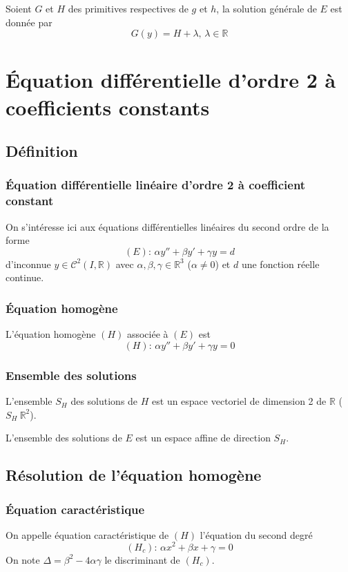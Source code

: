\documentclass[a4paper,10pt]{book} %
\newcommand{\R}{\mathbb{R}}
\begin{document}
Soient $G$ et $H$ des primitives respectives de $g$ et $h$,
la solution générale de $E$ est donnée par $$G(y)=H+\lambda\text{, }\lambda\in \R$$

\newpage

\section{Équation différentielle d'ordre 2 à coefficients constants}
\subsection{Définition}
\subsubsection{Équation différentielle linéaire d'ordre 2 à coefficient constant}
On s’intéresse ici aux équations différentielles linéaires du second ordre de la forme $$(E)\text{: } \alpha y''+\beta y'+\gamma y=d$$
d'inconnue $y\in \mathcal{C}^2(I,\R)$ avec $\alpha,\beta,\gamma\in \R^3$ ($\alpha\neq 0$) et $d$ une fonction réelle continue.

\subsubsection{Équation homogène}
L'équation homogène $(H)$ associée à $(E)$ est $$(H)\text{: } \alpha y''+\beta y'+\gamma y=0$$

\subsubsection{Ensemble des solutions}
L'ensemble $S_H$ des solutions de $H$ est un espace vectoriel de dimension 2 de $\R$ ($S_H~\R^2$).

L'ensemble des solutions de $E$ est un espace affine de direction $S_H$.

\subsection{Résolution de l'équation homogène}
\subsubsection{Équation caractéristique}
On appelle équation caractéristique de $(H)$ l'équation du second degré 
$$(H_c)\text{: }\alpha x^2+\beta x+\gamma=0$$
On note $\Delta=\beta^2-4\alpha\gamma$ le discriminant de $(H_c)$.
\end{document}
